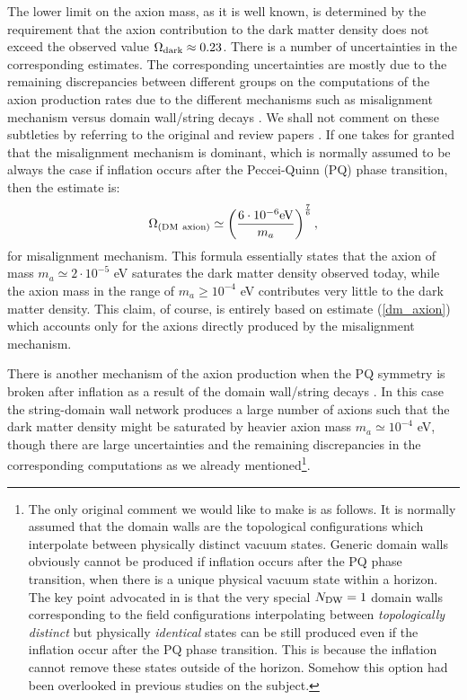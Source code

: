 \documentclass[ twocolumn,aps,prd,   
               preprintnumbers,numbers,sort&compress,nofootinbib,
                            showpacs,superscriptaddress,
               colorlinks,
               linkcolor=blue,   
               citecolor=blue]{revtex4-1}   \newcommand{\exclude}[1]{}
\newcommand{\be}{\begin{eqnarray}}
\newcommand{\ee}{\end{eqnarray}}
\begin{document}
 The lower limit on the axion mass, as it is well known, is  
   determined by the requirement that  the axion contribution to the dark matter density does not  exceed the observed value $\Omega_{\rm dark}\approx 0.23$. There is a number of uncertainties in the corresponding estimates. The corresponding uncertainties are mostly due to the  remaining discrepancies between different groups on the computations  of the  axion production  rates due to the  different mechanisms such as  misalignment mechanism \cite{misalignment} versus  domain wall/string decays \cite{Hiramatsu:2012gg,Kawasaki:2014sqa,Fleury:2015aca}.   We shall not comment on these  subtleties by referring to the   original and review papers \cite{vanBibber:2006rb,Asztalos:2006kz,Raffelt:2006cw,Sikivie:2009fv,Rosenberg:2015kxa,Graham:2015ouw}.  If one takes for granted  that  the misalignment mechanism is dominant, which is normally assumed to be always  the case if  inflation occurs after the  Peccei-Quinn (PQ) phase transition, then the estimate is:
 \be
 \label{dm_axion}
 \Omega_{\rm (DM ~axion)}\simeq \left(\frac{6\cdot 10^{-6} {\rm eV}}{m_a}\right)^{\frac{7}{6}}, 
 \ee 
 for misalignment mechanism.
 This formula essentially states that the axion of mass $m_a\simeq 2\cdot 10^{-5}$ eV saturates the dark matter density observed today, while the axion mass in the range of $m_a\geq  10^{-4}$ eV contributes very little to the dark matter density. This claim, of course, is entirely based on estimate (\ref{dm_axion}) which accounts only for the axions directly produced by the misalignment mechanism.
 
There is another mechanism of the axion production when the PQ symmetry is broken after inflation as a result of the domain wall/string decays \cite{Hiramatsu:2012gg,Kawasaki:2014sqa,Fleury:2015aca}.  
 In this case the string-domain wall network produces a large number of axions such that   the dark matter density  might be saturated by   heavier   axion mass $m_a \simeq   10^{-4}$ eV, though there are large uncertainties and the  remaining discrepancies in the corresponding computations as we already
  mentioned\footnote{The only original comment we would like to make is as follows. It is normally assumed that
 the domain walls are the topological configurations which interpolate between physically distinct vacuum states. Generic  domain walls obviously cannot be produced if inflation occurs after the PQ phase transition, when there is  a unique physical  vacuum state within a horizon. The key point advocated in \cite{Liang:2016tqc} is that the very special $N_{\rm DW}=1$ domain walls  corresponding  to the field configurations   interpolating  between  {\it  topologically distinct} but physically {\it identical} states can be still produced even if the inflation occur after the PQ phase transition.  This is because the inflation cannot remove  these states  outside of the horizon. Somehow this option had been overlooked in previous studies on the subject.}.
 
\end{document}
